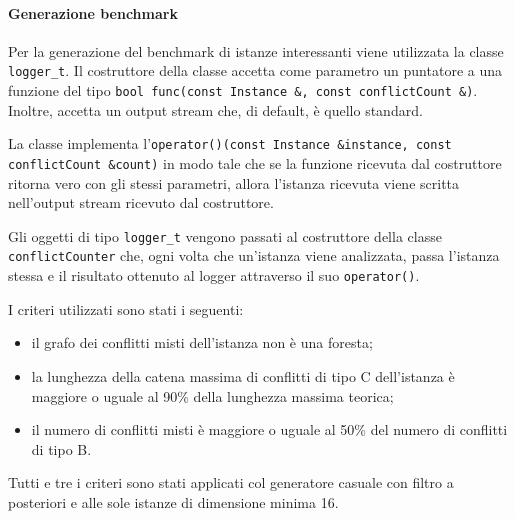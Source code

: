 \documentclass[../../../relazione.tex]{subfiles}
\begin{document}
\paragraph{Generazione benchmark}
Per la generazione del benchmark di istanze interessanti viene utilizzata la classe \texttt{logger\_t}.
Il costruttore della classe accetta come parametro un puntatore a una funzione del tipo \texttt{bool func(const Instance \&, const conflictCount \&)}.
Inoltre, accetta un output stream che, di default, è quello standard.

La classe implementa l'\texttt{operator()(const Instance \&instance, const conflictCount \&count)} in modo tale che se la funzione ricevuta dal costruttore ritorna vero con gli stessi parametri, allora l'istanza ricevuta viene scritta nell'output stream ricevuto dal costruttore.

Gli oggetti di tipo \texttt{logger\_t} vengono passati al costruttore della classe \texttt{conflictCounter} che, ogni volta che un'istanza viene analizzata, passa l'istanza stessa e il risultato ottenuto al logger attraverso il suo \texttt{operator()}.

I criteri utilizzati sono stati i seguenti:
\begin{itemize}
    \item il grafo dei conflitti misti dell'istanza non è una foresta;
    \item la lunghezza della catena massima di conflitti di tipo C dell'istanza è maggiore o uguale al 90\% della lunghezza massima teorica;
    \item il numero di conflitti misti è maggiore o uguale al 50\% del numero di conflitti di tipo B.
\end{itemize}
Tutti e tre i criteri sono stati applicati col generatore casuale con filtro a posteriori e alle sole istanze di dimensione minima 16.
\end{document}

